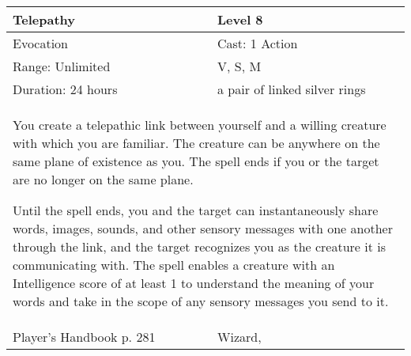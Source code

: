 \documentclass[11pt]{report}
\begin{document}
\begin{table}[H]
	\begin{tabular}{||p{6cm}|p{6cm}||}
		\hline\hline
		\bf{Telepathy} & Level 8\\ \hline
		Evocation & Cast: 1 Action\\ \hline
		Range: Unlimited & V, S, M\\ \hline
		Duration: 24 hours & a pair of linked silver rings\\ \hline
		\multicolumn{2}{||p{12cm}||}{You create a telepathic link between yourself and a willing creature with which you are familiar.
The creature can be anywhere on the same plane of existence as you. The spell ends if you or the target are no longer on the same plane.

Until the spell ends, you and the target can instantaneously share words, images, sounds, and other sensory messages with one another through the link, and the target recognizes you as the creature it is communicating with. The spell enables a creature with an Intelligence score of at least 1 to understand the meaning of your words and take in the scope of any sensory messages you send to it.}\\ \hline
Player's Handbook p. 281 & Wizard, \\ \hline\hline
	\end{tabular}
\end{table}
\end{document}
